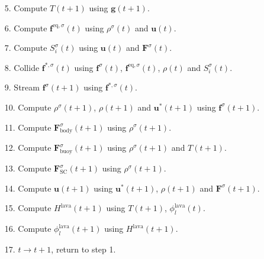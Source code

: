\begin{itemize}
    \item[5.] Compute $T(t+1)$ using $\bm{g}(t+1)$.
    \item[6.] Compute $\bm{f}^{\text{eq},\sigma}(t)$ using $\rho^\sigma(t)$ and $\bm{u}(t)$.
    \item[7.] Compute $S_i^\sigma(t)$ using $\bm{u}(t)$ and $\bm{F}^\sigma(t)$. 
    \item[8.] Collide $\bm{f}^{*, \sigma}(t)$ using $\bm{f}^\sigma(t)$, $\bm{f}^{\text{eq},\sigma}(t)$, $\rho(t)$ and $S_i^\sigma(t)$.
    \item[9.] Stream $\bm{f}^\sigma(t+1)$ using $\bm{f}^{*, \sigma}(t)$. 
    \item[10.] Compute $\rho^\sigma(t+1)$, $\rho(t+1)$ and $\bm{u}^\ast(t+1)$ using $\bm{f}^\sigma(t+1)$.
    \item[11.] Compute $\bm{F}^\sigma_{\text{body}}(t+1)$ using $\rho^\sigma(t+1)$.
    \item[12.] Compute $\bm{F}^\sigma_{\text{buoy}}(t+1)$ using $\rho^\sigma(t+1)$ and $T(t+1)$.
    \item[13.] Compute $\bm{F}^\sigma_{\text{SC}}(t+1)$ using $\rho^\sigma(t+1)$.
    \item[14.] Compute $\bm{u}(t+1)$ using $\bm{u}^\ast(t+1)$, $\rho(t+1)$ and $\bm{F}^\sigma(t+1)$.
    \item[15.] Compute $H^{\text{lava}}(t+1)$ using $T(t+1)$, $\phi_l^{\text{lava}}(t)$.
    \item[16.] Compute $\phi_l^{\text{lava}}(t+1)$ using $H^{\text{lava}}(t+1)$.
    \item[17.] $t \rightarrow t+1$, return to step 1. 
\end{itemize}

\clearpage


